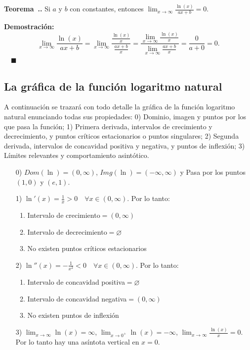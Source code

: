 \documentclass{article}
\numberwithin{equation}{section}
\newcommand{\Col}{\color{ProcessBlue}}
\newcommand{\col}[1]{\textcolor{ProcessBlue}{#1}}
\newcounter{theorem}[section]
\newenvironment
{theorem}[1][]
{\vspace{0.5cm}\refstepcounter{theorem}\par\medskip\noindent\textbf{\Col Teorema~\thesection.\thetheorem. #1}\rmfamily}
{}
\newenvironment
{proof}
{\par\medskip\noindent\textbf{Demostración:}\rmfamily}
{\Col\hfill$\quad \blacksquare$\vspace{0.5cm}}
\begin{document}
\begin{theorem}
    Si $a$ y $b$ con constantes, entonces $\lim_{x\to\infty}\frac{\ln(x)}{ax+b}=0.$
\end{theorem}

\begin{proof}
    $$ \lim_{x\to\infty}\frac{\ln(x)}{ax+b}=\lim_{x\to\infty}\frac{\frac{\ln(x)}{x}}{\frac{ax+b}{x}}=\frac{\lim_{x\to\infty}\frac{\ln(x)}{x}}{\lim_{x\to\infty}\frac{ax+b}{x}}=\frac{0}{a+0}=0.$$
\end{proof}

\subsection{\col{La gráfica de la función logaritmo natural}}

A continuación se trazará con todo detalle la gráfica de la función logaritmo natural enunciando todas sus propiedades: 0) Dominio, imagen y puntos por los que pasa la función; 1) Primera derivada, intervalos de crecimiento y decrecimiento, y puntos críticos estacionarios o puntos singulares; 2) Segunda derivada, intervalos de concavidad positiva y negativa, y puntos de inflexión; 3) Límites relevantes y comportamiento asintótico. 

\begin{enumerate}
    \item[0)] $Dom(\ln)=(0,\infty)$, $Img(\ln)=(-\infty,\infty)$ y Pasa por los puntos $(1,0)$ y $(e,1)$.
    \item[1)] $\ln'(x)=\frac{1}{x}>0 \quad \forall x\in (0,\infty)$. Por lo tanto:
    \begin{enumerate}
    \item Intervalo de crecimiento$=(0,\infty)$
    \item Intervalo de decrecimiento$=\varnothing$
    \item No existen puntos críticos estacionarios
    \end{enumerate} 
    \item[2)] $\ln''(x)=-\frac{1}{x^2}<0 \quad \forall x\in (0,\infty)$. Por lo tanto:
    \begin{enumerate}
    \item Intervalo de concavidad positiva$=\varnothing$
    \item Intervalo de concavidad negativa$=(0,\infty)$
    \item No existen puntos de inflexión
    \end{enumerate}
    \item[3)] $\lim_{x\to\infty}\ln(x)=\infty$, $\lim_{x\to 0^+}\ln(x)=-\infty$, $\lim_{x\to\infty}\frac{\ln(x)}{x}=0$. Por lo tanto hay una asíntota vertical en $x=0$.
\end{enumerate}
\end{document}
